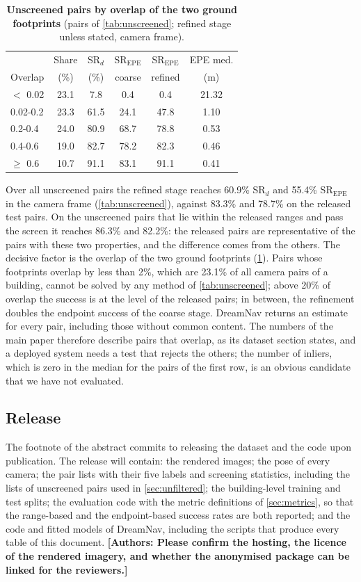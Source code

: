 \documentclass[10pt,twocolumn,letterpaper]{article}
\newcommand{\SRd}{SR$_{d}$}
\newcommand{\SRe}{SR$_{\mathrm{EPE}}$}
\newcommand{\todoauthors}[1]{\textbf{\color{red}[Authors: #1]}}
\begin{document}
\begin{table}[t]
\centering
\caption{\textbf{Unscreened pairs by overlap of the two ground footprints} (pairs of \cref{tab:unscreened}; refined stage unless stated, camera frame).}
\label{tab:overlap}
\footnotesize
\setlength{\tabcolsep}{4pt}
\begin{tabular}{@{}lccccc@{}}
\toprule
& Share & \SRd & \SRe & \SRe & EPE med. \\
Overlap & (\%) & (\%) & coarse & refined & (m) \\
\midrule
$<$ 0.02 & 23.1 & 7.8 & 0.4 & 0.4 & 21.32 \\
0.02-0.2 & 23.3 & 61.5 & 24.1 & 47.8 & 1.10 \\
0.2-0.4 & 24.0 & 80.9 & 68.7 & 78.8 & 0.53 \\
0.4-0.6 & 19.0 & 82.7 & 78.2 & 82.3 & 0.46 \\
$\geq$ 0.6 & 10.7 & 91.1 & 83.1 & 91.1 & 0.41 \\
\bottomrule
\end{tabular}
\end{table}

Over all unscreened pairs the refined stage reaches 60.9\% \SRd{} and 55.4\% \SRe{} in the camera frame (\cref{tab:unscreened}), against 83.3\% and 78.7\% on the released test pairs. On the unscreened pairs that lie within the released ranges and pass the screen it reaches 86.3\% and 82.2\%: the released pairs are representative of the pairs with these two properties, and the difference comes from the others. The decisive factor is the overlap of the two ground footprints (\cref{tab:overlap}). Pairs whose footprints overlap by less than 2\%, which are 23.1\% of all camera pairs of a building, cannot be solved by any method of \cref{tab:unscreened}; above 20\% of overlap the success is at the level of the released pairs; in between, the refinement doubles the endpoint success of the coarse stage. DreamNav returns an estimate for every pair, including those without common content. The numbers of the main paper therefore describe pairs that overlap, as its dataset section states, and a deployed system needs a test that rejects the others; the number of inliers, which is zero in the median for the pairs of the first row, is an obvious candidate that we have not evaluated.

\subsection{Release}

The footnote of the abstract commits to releasing the dataset and the code upon publication. The release will contain: the rendered images; the pose of every camera; the pair lists with their five labels and screening statistics, including the lists of unscreened pairs used in \cref{sec:unfiltered}; the building-level training and test splits; the evaluation code with the metric definitions of \cref{sec:metrics}, so that the range-based and the endpoint-based success rates are both reported; and the code and fitted models of DreamNav, including the scripts that produce every table of this document. \todoauthors{Please confirm the hosting, the licence of the rendered imagery, and whether the anonymised package can be linked for the reviewers.}
\end{document}
